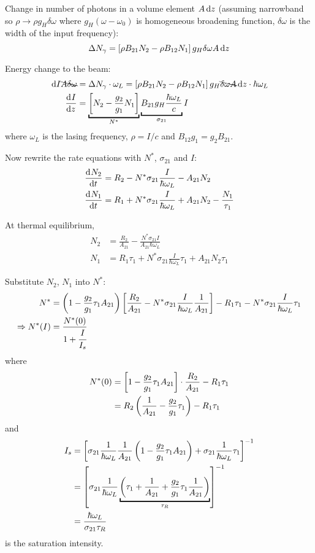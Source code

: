 \begin{parts}
	Change in number of photons in a volume element $A\,\mathrm{d}{z}$ (assuming narrowband so $\rho\to\rho g_H \delta\omega$ where $g_H(\omega - \omega_0)$ is homogeneous broadening function, $\delta\omega$ is the width of the input frequency):
	\begin{equation*}
		\Delta N_\gamma = \left[\rho B_{21}N_2 - \rho B_{12}N_1\right] g_H \delta\omega A \,\mathrm{d}{z}
	\end{equation*}
	
	Energy change to the beam:
	\begin{align*}
		\inftsml{I} \bcancel{A\delta\omega} &= \Delta N_\gamma\cdot\omega_L = \sbracket{\rho B_{21}N_2 - \rho B_{12}N_1} g_H \bcancel{\delta\omega A} \inftsml{z}\cdot\hbar\omega_L \\
		\deri{I}{z} &= \underbracket{\sbracket{N_2 - \frac{g_2}{g_1}N_1}}_{N^*} \underbracket{B_{21}g_H\frac{\hbar\omega_L}{c}}_{\sigma_{21}} I
	\end{align*}
	where $\omega_L$ is the lasing frequency, $\rho=I/c$ and $B_{12}g_1 = g_2 B_{21}$.
	
	Now rewrite the rate equations with $N^*$, $\sigma_{21}$ and $I$:
	\begin{align*}
		\frac{\mathrm{d}^{}{N_2}}{\mathrm{d}{t}^{}} &= R_2 - N^* \sigma_{21} \frac{I}{\hbar\omega_L} - A_{21}N_2 \\
		\frac{\mathrm{d}^{}{N_1}}{\mathrm{d}{t}^{}} &= R_1 + N^* \sigma_{21} \frac{I}{\hbar\omega_L} + A_{21}N_2 - \frac{N_1}{\tau_1}
	\end{align*}
	
	At thermal equilibrium,
	\begin{align*}
		N_2 &= \frac{R_2}{A_{21}} - \frac{N^* \sigma_{21} I}{A_{21}\hbar\omega_L} \\
		N_1 &= R_1 \tau_1 + N^* \sigma_{21} \frac{I}{\hbar\omega_L} \tau_1 + A_{21} N_2 \tau_1
	\end{align*}
	
	Substitute $N_2$, $N_1$ into $N^*$:
	\begin{align*}
		N^* &= \left(1-\frac{g_2}{g_1}\tau_1 A_{21}\right) \left[\frac{R_2}{A_{21}} - N^* \sigma_{21} \frac{I}{\hbar\omega_L} \frac{1}{A_{21}}\right] - R_1 \tau_1 - N^* \sigma_{21} \frac{I}{\hbar\omega_L} \tau_1 \\
		\Rightarrow N^*(I) &= \frac{N^*(0)}{1 + \cfrac{I}{I_s}}
	\end{align*}
	where
	\begin{align*}
		N^*(0) &= \left[1-\frac{g_2}{g_1}\tau_1 A_{21}\right] \cdot \frac{R_2}{A_{21}} - R_1 \tau_1 \\
		&= R_2 \left(\frac{1}{A_{21}} - \frac{g_2}{g_1}\tau_1\right) - R_1 \tau_1
	\end{align*}
	and
	\begin{align*}
		I_s &= \sbracket{\sigma_{21} \frac{1}{\hbar\omega_L}\frac{1}{A_{21}}\rbracket{1-\frac{g_2}{g_1}\tau_1 A_{21}} + \sigma_{21}\frac{1}{\hbar\omega_L}\tau_1}^{-1} \\
		&= \sbracket{\sigma_{21}\frac{1}{\hbar\omega_L}\underbracket{\rbracket{\tau_1 + \frac{1}{A_{21}} + \frac{g_2}{g_1}\tau_1 \frac{1}{A_{21}}}}_{\tau_R}}^{-1} \\
		&= \frac{\hbar\omega_L}{\sigma_{21}\tau_R}
	\end{align*}
	is the saturation intensity.
	

\end{parts}
